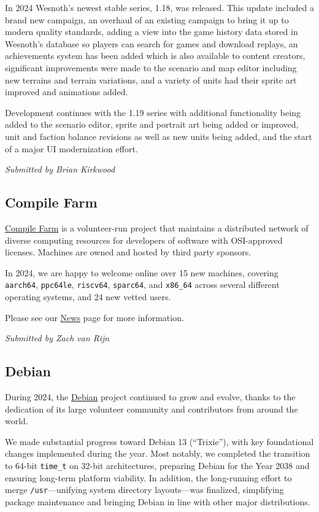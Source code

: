 \documentclass[a4paper]{report}
\begin{document}
In 2024 Wesnoth's newest stable series, 1.18, was released. This update included a brand new campaign, an overhaul of an existing campaign to bring it up to modern quality standards, adding a view into the game history data stored in Wesnoth's database so players can search for games and download replays, an achievements system has been added which is also available to content creators, significant improvements were made to the scenario and map editor including new terrains and terrain variations, and a variety of units had their sprite art improved and animations added.

Development continues with the 1.19 series with additional functionality being added to the scenario editor, sprite and portrait art being added or improved, unit and faction balance revisions as well as new units being added, and the start of a major UI modernization effort.

{\em Submitted by Brian Kirkwood}

\subsection{Compile Farm}

\href{https://portal.cfarm.net/}{Compile Farm} is a volunteer-run project that maintains a distributed network of diverse computing resources for developers of software with OSI-approved licenses. Machines are owned and hosted by third party sponsors.

In 2024, we are happy to welcome online over 15 new machines, covering {\tt aarch64}, {\tt ppc64le}, {\tt riscv64}, {\tt sparc64}, and {\tt x86\_64} across several different operating systems, and 24 new vetted users.

Please see our \href{https://portal.cfarm.net/news/}{News} page for more information.

{\em Submitted by Zach van Rijn}

\subsection{Debian}

During 2024, the \href{https://www.debian.org/}{Debian} project continued to grow and evolve, thanks to the dedication of its large volunteer community and contributors from around the world.

We made substantial progress toward Debian 13 (``Trixie''), with key foundational changes implemented during the year. Most notably, we completed the transition to 64-bit \texttt{time\_t} on 32-bit architectures, preparing Debian for the Year 2038 and ensuring long-term platform viability. In addition, the long-running effort to merge \texttt{/usr}—unifying system directory layouts—was finalized, simplifying package maintenance and bringing Debian in line with other major distributions.
\end{document}
